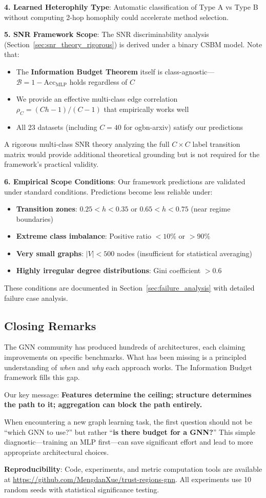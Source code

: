 \textbf{4. Learned Heterophily Type}: Automatic classification of Type A vs Type B without computing 2-hop homophily could accelerate method selection.

\textbf{5. SNR Framework Scope}: The SNR discriminability analysis (Section~\ref{sec:snr_theory_rigorous}) is derived under a binary CSBM model. Note that:
\begin{itemize}
    \item The \textbf{Information Budget Theorem} itself is class-agnostic---$\mathcal{B} = 1 - \text{Acc}_{\text{MLP}}$ holds regardless of $C$
    \item We provide an effective multi-class edge correlation $\rho_C = (Ch-1)/(C-1)$ that empirically works well
    \item All 23 datasets (including $C = 40$ for ogbn-arxiv) satisfy our predictions
\end{itemize}
A rigorous multi-class SNR theory analyzing the full $C \times C$ label transition matrix would provide additional theoretical grounding but is not required for the framework's practical validity.

\textbf{6. Empirical Scope Conditions}: Our framework predictions are validated under standard conditions. Predictions become less reliable under:
\begin{itemize}
    \item \textbf{Transition zones}: $0.25 < h < 0.35$ or $0.65 < h < 0.75$ (near regime boundaries)
    \item \textbf{Extreme class imbalance}: Positive ratio $< 10\%$ or $> 90\%$
    \item \textbf{Very small graphs}: $|V| < 500$ nodes (insufficient for statistical averaging)
    \item \textbf{Highly irregular degree distributions}: Gini coefficient $> 0.6$
\end{itemize}
These conditions are documented in Section~\ref{sec:failure_analysis} with detailed failure case analysis.

\subsection{Closing Remarks}

The GNN community has produced hundreds of architectures, each claiming improvements on specific benchmarks. What has been missing is a principled understanding of \textit{when} and \textit{why} each approach works. The Information Budget framework fills this gap.

Our key message: \textbf{Features determine the ceiling; structure determines the path to it; aggregation can block the path entirely.}

When encountering a new graph learning task, the first question should not be ``which GNN to use?'' but rather ``\textbf{is there budget for a GNN?}'' This simple diagnostic---training an MLP first---can save significant effort and lead to more appropriate architectural choices.

\textbf{Reproducibility}: Code, experiments, and metric computation tools are available at \url{https://github.com/MengdanXue/trust-regions-gnn}. All experiments use 10 random seeds with statistical significance testing.
